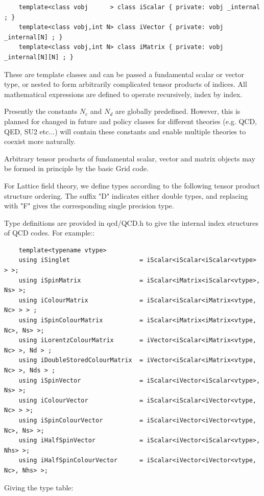 \documentclass[letter,10pt]{report}
\begin{document}
\begin{verbatim}
    template<class vobj      > class iScalar { private: vobj _internal ; } 
    template<class vobj,int N> class iVector { private: vobj _internal[N] ; } 
    template<class vobj,int N> class iMatrix { private: vobj _internal[N][N] ; }
\end{verbatim}

These are template classes and can be passed a fundamental scalar or vector type, or
nested to form arbitrarily complicated tensor products of indices. All mathematical expressions
are defined to operate recursively, index by index.

Presently the constants $N_c$ and $N_d$
are globally predefined. However, this is planned for changed in future and policy classes
for different theories (e.g. QCD, QED, SU2 etc...) will contain these constants and enable multiple
theories to coexist more naturally.

Arbitrary tensor products of fundamental scalar, vector
and matrix objects may be formed in principle by the basic Grid code. 

For Lattice field theory, we define types according to the following tensor
product structure ordering. The suffix "D" indicates either double types, and
replacing with "F" gives the corresponding single precision type.

Type definitions are provided in qcd/QCD.h to give the internal index structures
of QCD codes. For example::
\begin{verbatim}
    template<typename vtype> 
    using iSinglet                   = iScalar<iScalar<iScalar<vtype> > >;
    using iSpinMatrix                = iScalar<iMatrix<iScalar<vtype>, Ns> >;
    using iColourMatrix              = iScalar<iScalar<iMatrix<vtype, Nc> > > ;
    using iSpinColourMatrix          = iScalar<iMatrix<iMatrix<vtype, Nc>, Ns> >;
    using iLorentzColourMatrix       = iVector<iScalar<iMatrix<vtype, Nc> >, Nd > ;
    using iDoubleStoredColourMatrix  = iVector<iScalar<iMatrix<vtype, Nc> >, Nds > ;
    using iSpinVector                = iScalar<iVector<iScalar<vtype>, Ns> >;
    using iColourVector              = iScalar<iScalar<iVector<vtype, Nc> > >;
    using iSpinColourVector          = iScalar<iVector<iVector<vtype, Nc>, Ns> >;
    using iHalfSpinVector            = iScalar<iVector<iScalar<vtype>, Nhs> >;
    using iHalfSpinColourVector      = iScalar<iVector<iVector<vtype, Nc>, Nhs> >;
\end{verbatim}

Giving the type table:
\end{document}
